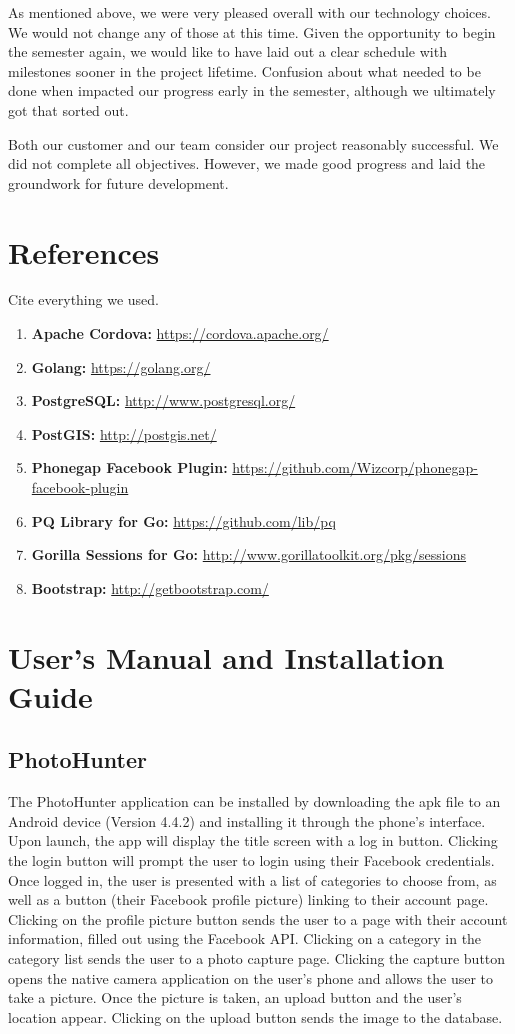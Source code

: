 \documentclass{article}
\begin{document}
As mentioned above, we were very pleased overall with our technology
choices. We would not change any of those at this time. Given the opportunity
to begin the semester again, we would like to have laid out a clear schedule
with milestones sooner in the project lifetime. Confusion about what needed to
be done when impacted our progress early in the semester, although we
ultimately got that sorted out.

Both our customer and our team consider our project reasonably successful. We
did not complete all objectives. However, we made good progress and laid the
groundwork for future development.

\section{References}
Cite everything we used.
\begin{enumerate}

\item \textbf{Apache Cordova:} \url{https://cordova.apache.org/}
\item \textbf{Golang:} \url{https://golang.org/}
\item \textbf{PostgreSQL:} \url{http://www.postgresql.org/}
\item \textbf{PostGIS:} \url{http://postgis.net/}
\item \textbf{Phonegap Facebook Plugin:} \url{https://github.com/Wizcorp/phonegap-facebook-plugin}
\item \textbf{PQ Library for Go:} \url{https://github.com/lib/pq}
\item \textbf{Gorilla Sessions for Go:} \url{http://www.gorillatoolkit.org/pkg/sessions}
\item \textbf{Bootstrap:} \url{http://getbootstrap.com/}

\end{enumerate}

\section{User's Manual and Installation Guide}
\subsection{PhotoHunter}
The PhotoHunter application can be installed by downloading the apk file to an
Android device (Version 4.4.2) and installing it through the phone's interface.
Upon launch, the app will display the title screen with a log in button.
Clicking the login button will prompt the user to login using their Facebook
credentials.  Once logged in, the user is presented with a list of categories
to choose from, as well as a button (their Facebook profile picture) linking to
their account page.  Clicking on the profile picture button sends the user to a
page with their account information, filled out using the Facebook API.
Clicking on a category in the category list sends the user to a photo capture
page.  Clicking the capture button opens the native camera application on the
user's phone and allows the user to take a picture.  Once the picture is taken,
an upload button and the user's location appear.  Clicking on the upload button
sends the image to the database.
\end{document}
